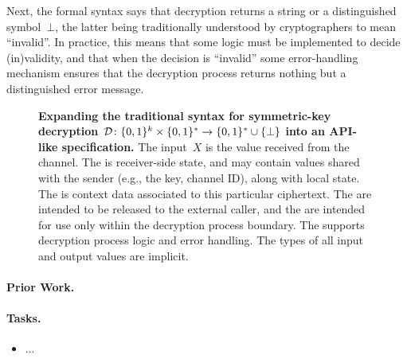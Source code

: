 Next, the formal syntax says that decryption returns a
string or a distinguished symbol~$\bot$, the latter being
traditionally understood by cryptographers to mean ``invalid''.  In
practice, this means that some logic must be implemented to decide
(in)validity, and that when the decision is ``invalid'' some
error-handling mechanism ensures that the decryption process returns
nothing but a distinguished error message.




\begin{figure}
\centering
{}
\caption{{\bf Expanding the traditional syntax for symmetric-key decryption $\mathcal{D}
  \colon\{0,1\}^k \times \{0,1\}^* \to \{0,1\}^* \cup \{\bot\}$ into an
  API-like specification.} The input~$X$ is the value received from the
  channel.  The  is
  receiver-side state, and may contain values shared with the sender
  (e.g., the key, channel ID), along with local state.  The
   is context data associated to this particular
  ciphertext. The  are intended to be released
  to the external caller, and the  are intended
  for use only within the decryption process boundary.  The
   supports decryption process logic and error
  handling.  
  The types of all input and output values are implicit.}
\label{fig:syntax-api-example}
\end{figure}

\paragraph{Prior Work.} 


\paragraph{Tasks.}
\begin{itemize}
\item ...
\end{itemize}


